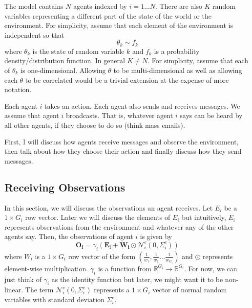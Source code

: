\documentclass{article}
\begin{document}
The model contains $N$ agents indexed by $i=1...N$.  There are also
$K$ random variables representing a different part of the state of the
world or the environment.  For simplicity, assume that each element of
the environment is independent so that
\begin{equation}
  \theta_k \sim f_k
\end{equation}
where $\theta_k$ is the state of random variable $k$ and $f_k$ is a
probability density/distribution function.  In general $K\neq N$.  For
simplicity, assume that each of $\theta_k$ is one-dimensional.
Allowing $\theta$ to be multi-dimensional as well as allowing each
$\theta$ to be correlated would be a trivial extension at the expense
of more notation.

Each agent $i$ takes an action.  Each agent also sends and receives
messages.  We assume that agent $i$ broadcasts.  That is, whatever
agent $i$ says can be heard by all other agents, if they choose to do
so (think mass emails). 

First, I will discuss how agents receive messages and observe the
environment, then talk about how they choose their action  and finally
discuss how they send messages. 

\subsection{Receiving Observations}
In this  section, we will discuss the observations an agent receives.
Let $E_i$ be a $1\times G_i$ row vector.  Later we will discuss the
elements of $E_i$ but intuitively, $E_i$ represents observations from
the environment and whatever any of the other agents say.  Then, the
observations of agent $i$ is given by
\begin{equation}
  \mathbf{O_{i}} = \gamma_i(\mathbf{E_i} + \mathbf{W_i}\odot
  \mathcal{N}^e_{i}(0, \Sigma^e_{i}))
\end{equation}
where $W_i$ is a $1\times G_i$ row vector of the form $(\frac{1}{w_1},\frac{1}{w_1}...\frac{1}{w_{G_i}})$
and $\odot$ represents element-wise multiplication.  $\gamma_i$ is a
function from $\mathbb{R}^{G_i} \rightarrow \mathbb{R}^{G_i}$.  For
now, we can just think of $\gamma_i$ as the identity 
function but later, we might want it to be non-linear.  The term
$\mathcal{N}^e_{i}(0, \Sigma^e_{i})$ represents a $1\times G_i$ vector
of normal random variables with standard deviation $\Sigma^e_{i}$.
\end{document}
